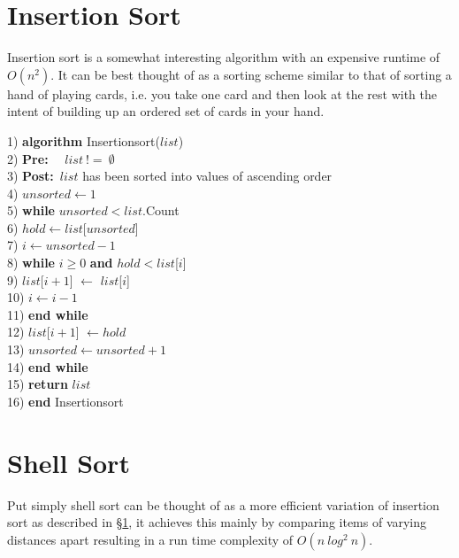 \newpage
\section{Insertion Sort} \label{shell_sort}
Insertion sort is a somewhat interesting algorithm with an expensive runtime of $O(n^{2})$. It can be best thought of as a sorting scheme similar to that of sorting a hand of playing cards, i.e. you take one card and then look at the rest with the intent of building up an ordered set of cards in your hand.

\begin{tabbing}
1)  \textbf{alg}\= \textbf{orithm} Insertionsort($list$) \\
2)  \> \textbf{Pre:}~~ $list~!=~\emptyset$ \\
3)  \> \textbf{Post:}~$list$ has been sorted into values of ascending order \\
4)  \> $unsorted \leftarrow 1$ \\
5)  \> \textbf{whi}\= \textbf{le} $unsorted < list$.Count \\
6)  \> \> $hold \leftarrow list$[$unsorted$] \\
7)  \> \> $i \leftarrow unsorted - 1$ \\
8)  \> \> \textbf{whi}\= \textbf{le} $i \geq 0$ \textbf{and} $hold < list$[$i$] \\
9)  \> \> \> $list$[$i + 1$] $\leftarrow$ $list$[$i$] \\
10) \> \> \> $i \leftarrow i - 1$ \\
11) \> \> \textbf{end while} \\
12) \> \> $list$[$i+1$] $\leftarrow hold$ \\
13) \> \> $unsorted \leftarrow unsorted + 1$ \\
14) \> \textbf{end while} \\
15) \> \textbf{return} $list$ \\
16) \textbf{end} Insertionsort \\
\end{tabbing}

\newpage
\section{Shell Sort}
Put simply shell sort can be thought of as a more efficient variation of insertion sort as described in \S\ref{shell_sort}, it achieves this mainly by comparing items of varying distances apart resulting in a run time complexity of $O(n~log^{2}~n)$.

